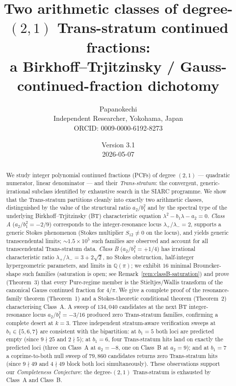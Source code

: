 \documentclass[11pt,a4paper]{article}
\title{Two arithmetic classes of degree-$(2,1)$ Trans-stratum continued fractions:\\
  a Birkhoff--Trjitzinsky / Gauss-continued-fraction dichotomy}
\author{Papanokechi\\
Independent Researcher, Yokohama, Japan\\
ORCID: 0009-0000-6192-8273\\
\email{shkubo@outlook.jp}}
\date{Version 3.1 \\ 2026-05-07}
\theoremstyle{definition}
\begin{document}
\maketitle

\begin{abstract}
We study integer polynomial continued fractions (PCFs) of degree $(2,1)$ — quadratic numerator, linear denominator — and their \emph{Trans-stratum}: the convergent, generic-irrational subclass identified by exhaustive search in the SIARC programme. We show that the Trans-stratum partitions cleanly into exactly two arithmetic classes, distinguished by the value of the structural ratio $a_2/b_1^2$ and by the spectral type of the underlying Birkhoff--Trjitzinsky (BT) characteristic equation $\lambda^2 - b_1\lambda - a_2 = 0$. \emph{Class A} ($a_2/b_1^2 = -2/9$) corresponds to the integer-resonance locus $\lambda_+ /\lambda_- = 2$, supports a generic Stokes phenomenon (Stokes multiplier $S_{12}\ne 0$ on the locus), and yields generic transcendental limits; $\sim\!1.5\times 10^5$ such families are observed and account for all transcendental Trans-stratum data. \emph{Class B} ($a_2/b_1^2 = +1/4$) has irrational characteristic ratio $\lambda_+/\lambda_- = 3+2\sqrt{2}$, no Stokes obstruction, half-integer hypergeometric parameters, and limits in $\mathbb{Q}(\pi)$; we exhibit $16$ minimal Brouncker-shape such families (saturation is open; see Remark~\ref{rem:classB-saturation}) and prove (Theorem~3) that every Pure-regime member is the Stieltjes/Wallis transform of the canonical Gauss continued fraction for $4/\pi$. We give a complete proof of the resonance-family theorem (Theorem~1) and a Stokes-theoretic conditional theorem (Theorem~2) characterising Class~A. A sweep of $134{,}040$ candidates at the next BT integer-resonance locus $a_2/b_1^2 = -3/16$ produced zero Trans-stratum families, confirming a complete desert at $k=3$. Three independent stratum-aware verification sweeps at $b_1 \in \{5, 6, 7\}$ are consistent with the bipartition: at $b_1 = 5$ both loci are predicted empty (since $9 \nmid 25$ and $2 \nmid 5$); at $b_1 = 6$, four Trans-stratum hits land on exactly the predicted loci (three on Class~A at $a_2 = -8$, one on Class~B at $a_2 = 9$); and at $b_1 = 7$ a coprime-to-both null sweep of $79{,}860$ candidates returns zero Trans-stratum hits (since $9 \nmid 49$ and $4 \nmid 49$ block both loci simultaneously). These observations support our \emph{Completeness Conjecture}: the degree-$(2,1)$ Trans-stratum is exhausted by Class~A and Class~B.
\end{abstract}
\end{document}
